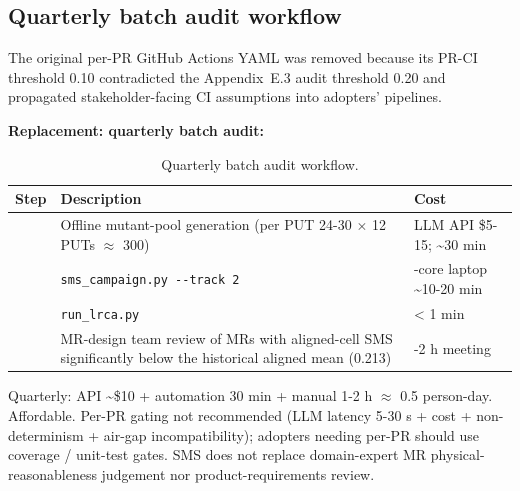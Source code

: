 \documentclass[manuscript,screen,review]{acmart}
\begin{document}
\subsection{Quarterly batch audit workflow}\label{e.2-quarterly-batch-audit-workflow}

The original per-PR GitHub Actions YAML was removed because its PR-CI
threshold 0.10 contradicted the Appendix~E.3 audit threshold 0.20 and propagated
stakeholder-facing CI assumptions into adopters' pipelines.

\textbf{Replacement: quarterly batch audit:}

{%
\begin{longtable}[]{@{}
  >{\raggedright\arraybackslash}p{}
  >{\raggedright\arraybackslash}p{}
  >{\raggedright\arraybackslash}p{}@{}}
\caption{Quarterly batch audit workflow.}\label{tab:p2-26}\\
\toprule\noalign{}
\begin{minipage}[b]{\linewidth}\raggedright
Step
\end{minipage} & \begin{minipage}[b]{\linewidth}\raggedright
Description
\end{minipage} & \begin{minipage}[b]{\linewidth}\raggedright
Cost
\end{minipage} \\
\midrule\noalign{}
\endfirsthead
\endhead
\bottomrule\noalign{}
\endlastfoot
1 & Offline mutant-pool generation (per PUT 24-30 $\times$ 12 PUTs $\approx$ 300) & LLM
API \$5-15; \textasciitilde30 min \\
2 & \texttt{sms\_campaign.py\ -\/-track\ 2} & 4-core laptop
\textasciitilde10-20 min \\
3 & \texttt{run\_lrca.py} & \textless{} 1 min \\
4 & MR-design team review of MRs with aligned-cell SMS significantly
below the historical aligned mean (0.213) & 1-2 h meeting \\
\end{longtable}
}

Quarterly: API \textasciitilde\$10 + automation 30 min + manual 1-2 h $\approx$
0.5 person-day. Affordable. Per-PR gating not recommended (LLM latency
5-30 s + cost + non-determinism + air-gap incompatibility); adopters
needing per-PR should use coverage / unit-test gates. SMS does not
replace domain-expert MR physical-reasonableness judgement nor
product-requirements review.
\end{document}
